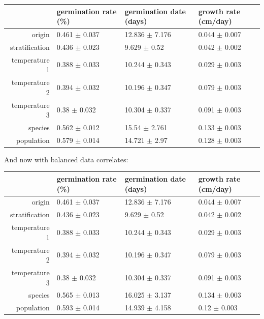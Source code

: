 \documentclass[12pt]{article}\usepackage[]{graphicx}\usepackage[]{color}
\begin{document}
\begin{longtable}{rlll}
	\hline
	& germination rate (\%) & germination date (days) & growth rate (cm/day) \\ 
	\hline
	origin & 0.461 $\pm$ 0.037 & 12.836 $\pm$ 7.176 & 0.044 $\pm$ 0.007 \\ 
	stratification & 0.436 $\pm$ 0.023 & 9.629 $\pm$ 0.52 & 0.042 $\pm$ 0.002 \\ 
	temperature 1 & 0.388 $\pm$ 0.033 & 10.244 $\pm$ 0.343 & 0.029 $\pm$ 0.003 \\ 
	temperature 2 & 0.394 $\pm$ 0.032 & 10.196 $\pm$ 0.347 & 0.079 $\pm$ 0.003 \\ 
	temperature 3 & 0.38 $\pm$ 0.032 & 10.304 $\pm$ 0.337 & 0.091 $\pm$ 0.003 \\ 
	species & 0.562 $\pm$ 0.012 & 15.54 $\pm$ 2.761 & 0.133 $\pm$ 0.003 \\ 
	population & 0.579 $\pm$ 0.014 & 14.721 $\pm$ 2.97 & 0.128 $\pm$ 0.003 \\ 
	\hline
	\hline
\end{longtable}

And now with balanced data correlates: 
\begin{longtable}{rlll}
	\hline
	& germination rate (\%) & germination date (days) & growth rate (cm/day) \\ 
	\hline
	origin & 0.461 $\pm$ 0.037 & 12.836 $\pm$ 7.176 & 0.044 $\pm$ 0.007 \\ 
	stratification & 0.436 $\pm$ 0.023 & 9.629 $\pm$ 0.52 & 0.042 $\pm$ 0.002 \\ 
	temperature 1 & 0.388 $\pm$ 0.033 & 10.244 $\pm$ 0.343 & 0.029 $\pm$ 0.003 \\ 
	temperature 2 & 0.394 $\pm$ 0.032 & 10.196 $\pm$ 0.347 & 0.079 $\pm$ 0.003 \\ 
	temperature 3 & 0.38 $\pm$ 0.032 & 10.304 $\pm$ 0.337 & 0.091 $\pm$ 0.003 \\ 
	species & 0.565 $\pm$ 0.013 & 16.025 $\pm$ 3.137 & 0.134 $\pm$ 0.003 \\ 
	population & 0.593 $\pm$ 0.014 & 14.939 $\pm$ 4.158 & 0.12 $\pm$ 0.003 \\ 
	\hline
	\hline
\end{longtable}
\end{document}

